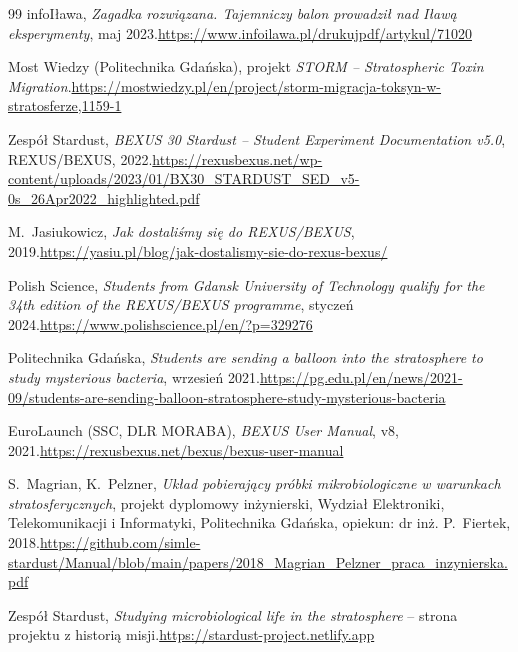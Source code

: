 \begin{thebibliography}{99}
 infoIława, \emph{Zagadka rozwiązana. Tajemniczy balon prowadził nad Iławą eksperymenty}, maj 2023.\newline\url{https://www.infoilawa.pl/drukujpdf/artykul/71020}

 Most Wiedzy (Politechnika Gdańska), projekt \emph{STORM -- Stratospheric Toxin Migration}.\newline\url{https://mostwiedzy.pl/en/project/storm-migracja-toksyn-w-stratosferze,1159-1}

 Zespół Stardust, \emph{BEXUS 30 Stardust -- Student Experiment Documentation v5.0}, REXUS/BEXUS, 2022.\newline\url{https://rexusbexus.net/wp-content/uploads/2023/01/BX30_STARDUST_SED_v5-0s_26Apr2022_highlighted.pdf}

 M.~Jasiukowicz, \emph{Jak dostaliśmy się do REXUS/BEXUS}, 2019.\newline\url{https://yasiu.pl/blog/jak-dostalismy-sie-do-rexus-bexus/}

 Polish Science, \emph{Students from Gdansk University of Technology qualify for the 34th edition of the REXUS/BEXUS programme}, styczeń 2024.\newline\url{https://www.polishscience.pl/en/?p=329276}

 Politechnika Gdańska, \emph{Students are sending a balloon into the stratosphere to study mysterious bacteria}, wrzesień 2021.\newline\url{https://pg.edu.pl/en/news/2021-09/students-are-sending-balloon-stratosphere-study-mysterious-bacteria}

 EuroLaunch (SSC, DLR MORABA), \emph{BEXUS User Manual}, v8, 2021.\newline\url{https://rexusbexus.net/bexus/bexus-user-manual}

 S.~Magrian, K.~Pelzner, \emph{Układ pobierający próbki mikrobiologiczne w warunkach stratosferycznych}, projekt dyplomowy inżynierski, Wydział Elektroniki, Telekomunikacji i Informatyki, Politechnika Gdańska, opiekun: dr inż. P.~Fiertek, 2018.\newline\url{https://github.com/simle-stardust/Manual/blob/main/papers/2018_Magrian_Pelzner_praca_inzynierska.pdf}

 Zespół Stardust, \emph{Studying microbiological life in the stratosphere} -- strona projektu z historią misji.\newline\url{https://stardust-project.netlify.app}


\end{thebibliography}
